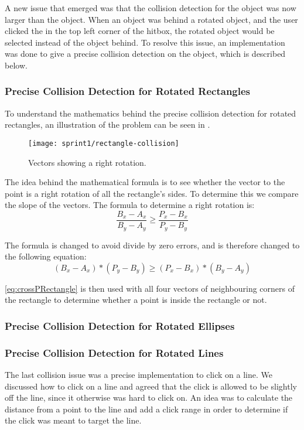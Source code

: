 A new issue that emerged was that the collision detection for the object was now larger than the object.
When an object was behind a rotated object, and the user clicked the in the top left corner of the hitbox, the rotated object would be selected instead of the object behind.
To resolve this issue, an implementation was done to give a precise collision detection on the object, which is described below.

\subsubsection{Precise Collision Detection for Rotated Rectangles}
To understand the mathematics behind the precise collision detection for rotated rectangles, an illustration of the problem can be seen in .

\begin{figure}[h]
	\centering
	\texttt{[image: sprint1/rectangle-collision]}
	\caption{Vectors showing a right rotation.}
	\label{figure:rectangle-collision}
\end{figure}

The idea behind the mathematical formula is to see whether the vector to the point is a right rotation of all the rectangle's sides.
To determine this we compare the slope of the vectors.
The formula to determine a right rotation is:
\begin{equation}
	\frac{B_x-A_x}{B_y-A_y} \geq \frac{P_x-B_x}{P_y-B_y}
\end{equation}

The formula is changed to avoid divide by zero errors, and is therefore changed to the following equation:
\begin{equation}\label{eq:crossPRectangle}
	(B_x-A_x)*(P_y-B_y) \geq (P_x-B_x)*(B_y-A_y)
\end{equation} 

\eqref{eq:crossPRectangle} is then used with all four vectors of neighbouring corners of the rectangle to determine whether a point is inside the rectangle or not.

\subsubsection{Precise Collision Detection for Rotated Ellipses}


\subsubsection{Precise Collision Detection for Rotated Lines}
The last collision issue was a precise implementation to click on a line.
We discussed how to click on a line and agreed that the click is allowed to be slightly off the line, since it otherwise was hard to click on.
An idea was to calculate the distance from a point to the line and add a click range in order to determine if the click was meant to target the line.

